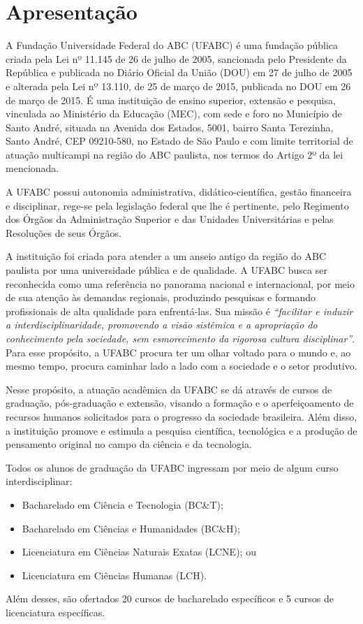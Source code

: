 \section{Apresentação}
\label{sec:apresentacao}

A Fundação Universidade Federal do ABC (UFABC) é uma fundação pública criada
pela Lei nº 11.145 de 26 de julho de 2005, sancionada pelo Presidente da
República e publicada no Diário Oficial da União (DOU) em 27 de julho de 2005 e
alterada pela Lei nº 13.110, de 25 de março de 2015, publicada no DOU em 26 de
março de 2015.
É uma instituição de ensino superior, extensão e pesquisa, vinculada ao
Ministério da Educação (MEC), com sede e foro no Município de Santo André,
situada na Avenida dos Estados, 5001, bairro Santa Terezinha, Santo André, CEP
09210-580, no Estado de São Paulo e com limite territorial de atuação
multicampi na região do ABC paulista, nos termos do Artigo 2º da lei
mencionada.

A UFABC possui autonomia administrativa, didático-científica, gestão financeira
e disciplinar, rege-se pela legislação federal que lhe é pertinente, pelo
Regimento dos Órgãos da Administração Superior e das Unidades Universitárias e
pelas Resoluções de seus Órgãos.

A instituição foi criada para atender a um anseio antigo da região do ABC
paulista por uma universidade pública e de qualidade.
A UFABC busca ser reconhecida como uma referência no panorama nacional e
internacional, por meio de sua atenção às demandas regionais, produzindo
pesquisas e formando profissionais de alta qualidade para enfrentá-las.
Sua missão é \textit{``facilitar e induzir a interdisciplinaridade, promovendo
a visão sistêmica e a apropriação do conhecimento pela sociedade, sem
esmorecimento da rigorosa cultura disciplinar''}.
Para esse propósito, a UFABC procura ter um olhar voltado para o mundo e, ao
mesmo tempo, procura caminhar lado a lado com a sociedade e o setor produtivo.

Nesse propósito, a atuação acadêmica da UFABC se dá através de cursos de
graduação, pós-graduação e extensão, visando a formação e o aperfeiçoamento de
recursos humanos solicitados para o progresso da sociedade brasileira.
Além disso, a instituição promove e estimula a pesquisa científica, tecnológica
e a produção de pensamento original no campo da ciência e da tecnologia.

Todos os alunos de graduação da UFABC ingressam por meio de algum curso
interdisciplinar:
\begin{itemize}
    \item Bacharelado em Ciência e Tecnologia (BC\&T);
    \item Bacharelado em Ciências e Humanidades (BC\&H);
    \item Licenciatura em Ciências Naturais Exatas (LCNE); ou
    \item Licenciatura em Ciências Humanas (LCH).
\end{itemize}
Além desses, são ofertados 20 cursos de bacharelado específicos e 5 cursos de
licenciatura específicas.



